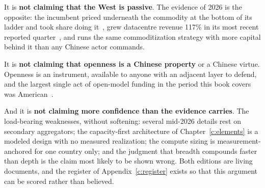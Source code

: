 It is \textbf{not claiming that the West is passive}. The evidence of 2026 is the opposite: the incumbent priced underneath the commodity at the bottom of its ladder and took share doing it~\cite{price-inversion}, grew datacentre revenue 117\% in its most recent reported quarter~\cite{nvda-q2fy27}, and runs the same commoditization strategy with more capital behind it than any Chinese actor commands.

It is \textbf{not claiming that openness is a Chinese property} or a Chinese virtue. Openness is an instrument, available to anyone with an adjacent layer to defend, and the largest single act of open-model funding in the period this book covers was American~\cite{nvda-poolside}.

And it is \textbf{not claiming more confidence than the evidence carries}. The load-bearing weaknesses, without softening: several mid-2026 details rest on secondary aggregators; the capacity-first architecture of Chapter~\ref{c:elements} is a modeled design with no measured realization; the compute sizing is measurement-anchored for one country only; and the judgment that breadth compounds faster than depth is the claim most likely to be shown wrong. Both editions are living documents, and the register of Appendix~\ref{c:register} exists so that this argument can be scored rather than believed.
